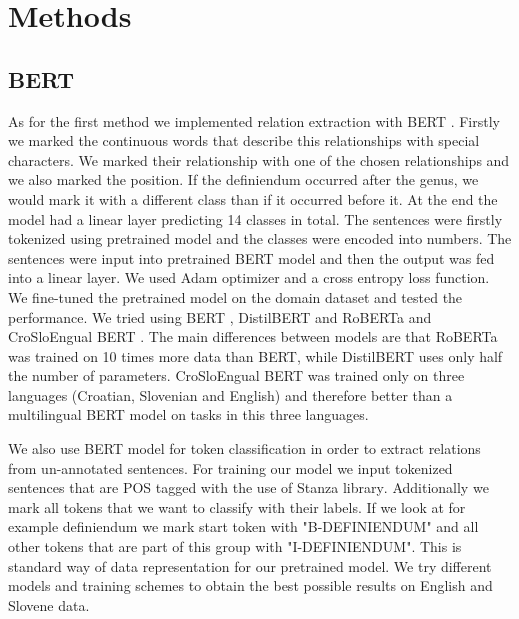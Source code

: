 \documentclass[fleqn,moreauthors,10pt]{ds_report}
\begin{document}

\section{Methods}
\subsection{BERT}
\par As for the first method we implemented relation extraction with BERT \cite{BERT:DBLP:journals/corr/abs-1810-04805}. Firstly we marked the continuous words that describe this relationships with special characters. We marked their relationship with one of the chosen relationships and we also marked the position. If the definiendum occurred after the genus, we would mark it with a different class than if it occurred before it. At the end the model had a linear layer predicting 14 classes in total. The sentences were firstly tokenized using pretrained model and the classes were encoded into numbers. The sentences were input into pretrained BERT model and then the output was fed into a linear layer. We used Adam optimizer and a cross entropy loss function. We fine-tuned the pretrained model on the domain dataset and tested the performance. We tried using BERT \cite{BERT:DBLP:journals/corr/abs-1810-04805}, DistilBERT \cite{distiledBert:DBLP:journals/corr/abs-1910-01108} and RoBERTa \cite{roberta:DBLP:journals/corr/abs-1907-11692} and CroSloEngual BERT \cite{ulcar-robnik2020finest}. The main differences between models are that RoBERTa was trained on 10 times more data than BERT, while DistilBERT uses only half the number of parameters. CroSloEngual BERT was trained only on three languages (Croatian, Slovenian and English) and therefore better than a multilingual BERT model on tasks in this three languages. 

\par We also use BERT model for token classification in order to extract relations from un-annotated sentences. For training our model we input tokenized sentences that are POS tagged with the use of Stanza library\textsuperscript{\cite{qi2020stanza}}. Additionally we mark all tokens that we want to classify with their labels. If we look at for example definiendum we mark start token with "B-DEFINIENDUM" and all other tokens that are part of this group with "I-DEFINIENDUM". This is standard way of data representation for our pretrained model. We try different models and training schemes to obtain the best possible results on English and Slovene data. 
\end{document}
